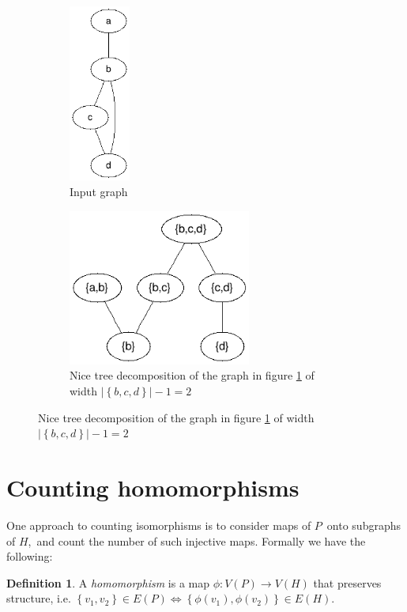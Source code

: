 \documentclass[a4paper,11pt]{report}
\theoremstyle{plain}
\theoremstyle{definition}
\newtheorem{defn}[thm]{Definition} %
\begin{document}
\begin{figure}[here]
\centering
\begin{subfigure}[b]{\linewidth}
\centering
\includegraphics[width=2cm]{images/input_graph.png} 
\caption[Graph]{Input graph}
\label{fig:arbitrary-graph}
\end{subfigure}
\begin{subfigure}[b]{\linewidth}
\centering
\includegraphics[width=6cm]{images/nice_tree_decomp.png} 
\caption[Decomposition]{Nice tree decomposition of the graph in figure \ref{fig:arbitrary-graph} of width $|\left\{b, c, d\right\}| - 1 = 2$}
\label{fig:decomp-graph}
\end{subfigure}
\end{figure}

\begin{figure}[here]
\end{figure}

\section{Counting homomorphisms}
One approach to counting isomorphisms is to consider maps of $P$ onto subgraphs of $H$, and count the number of such injective maps.
Formally we have the following:

\begin{defn}
A \emph{homomorphism} is a map $\phi : V(P) \rightarrow V(H)$ that preserves structure,
i.e. $\left\{v_1, v_2\right\} \in E(P) \Leftrightarrow \left\{\phi(v_1), \phi(v_2)\right\} \in E(H)$.
\end{defn}
\end{document}

